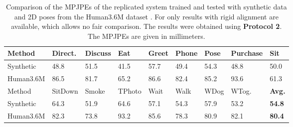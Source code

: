 \begin{table}[]	
	\centering
	\begin{tabularx}{\textwidth}{l *{8}{Y}}
		\toprule
		Method & Direct. & Discuss & Eat & Greet & Phone & Pose & Purchase & Sit \\
		\midrule
		Synthetic & 48.8 & 51.5 & 41.5 & 57.7 & 49.4 & 54.3 & 48.8 & 50.0 \\
		Human3.6M & 86.5 & 81.7 & 65.2 & 86.6 & 82.4 & 85.2 & 93.6 & 61.3 \\
		\bottomrule
		\toprule
		Method & SitDown & Smoke & TPhoto & Wait & Walk & WDog & WTog. & \textbf{Avg.}\\
		\midrule
		Synthetic & 64.3 & 51.9 & 64.6 & 57.1 & 54.3 & 57.9 & 53.2 & \textbf{54.8} \\
		Human3.6M & 82.3 & 73.8 & 93.2 & 85.6 & 78.3 & 80.9 & 82.1 & \textbf{80.4} \\
		\bottomrule
	\end{tabularx}
	\caption{
		Comparison of the MPJPEs of the replicated system trained and tested with synthetic data and 2D poses from the Human3.6M dataset \cite{ionescu14}. 
		For \cite{drover18} only results with rigid alignment are available, which allows no fair comparison.
		The results were obtained using \textbf{Protocol 2}. The MPJPEs are given in millimeters.
	 }
	\label{tbl:results-original-protocol2}
\end{table}